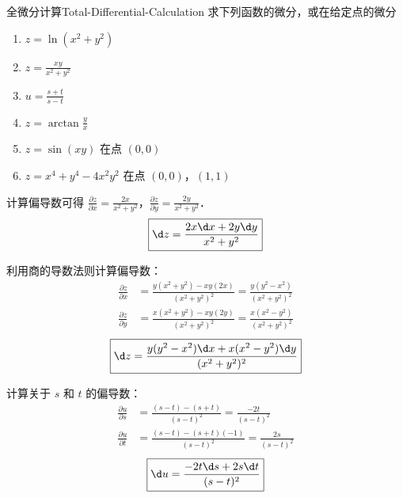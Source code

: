 \begin{problem}{全微分计算}{Total-Differential-Calculation}
    求下列函数的微分，或在给定点的微分
    \begin{enumerate}
        \item $z = \ln(x^2 + y^2)$
        \item $z = \frac{xy}{x^2 + y^2}$
        \item $u = \frac{s + t}{s - t}$
        \item $z = \arctan \frac{y}{x}$
        \item $z = \sin(xy)$ 在点 $(0,0)$
        \item $z = x^4 + y^4 - 4x^2y^2$ 在点 $(0,0)$，$(1,1)$
    \end{enumerate}
\end{problem}

\begin{solution}
    计算偏导数可得 $\frac{\partial z}{\partial x} = \frac{2x}{x^2+y^2}$，$\frac{\partial z}{\partial y} = \frac{2y}{x^2+y^2}$．
    \begin{equation}
        \boxed{\d z = \frac{2x \d x + 2y \d y}{x^2 + y^2}}
    \end{equation}

    利用商的导数法则计算偏导数：
    \begin{equation}
        \begin{aligned}
            \frac{\partial z}{\partial x} & = \frac{y(x^2 + y^2) - xy(2x)}{(x^2 + y^2)^2} = \frac{y(y^2 - x^2)}{(x^2 + y^2)^2} \\
            \frac{\partial z}{\partial y} & = \frac{x(x^2 + y^2) - xy(2y)}{(x^2 + y^2)^2} = \frac{x(x^2 - y^2)}{(x^2 + y^2)^2}
        \end{aligned}
    \end{equation}
    \begin{equation}
        \boxed{\d z = \frac{y(y^2 - x^2) \d x + x(x^2 - y^2) \d y}{(x^2 + y^2)^2}}
    \end{equation}

    计算关于 $s$ 和 $t$ 的偏导数：
    \begin{equation}
        \begin{aligned}
            \frac{\partial u}{\partial s} & = \frac{(s - t) - (s + t)}{(s - t)^2} = \frac{-2t}{(s - t)^2}    \\
            \frac{\partial u}{\partial t} & = \frac{(s - t) - (s + t)(-1)}{(s - t)^2} = \frac{2s}{(s - t)^2}
        \end{aligned}
    \end{equation}
    \begin{equation}
        \boxed{\d u = \frac{-2t \d s + 2s \d t}{(s - t)^2}}
    \end{equation}


\end{solution}
